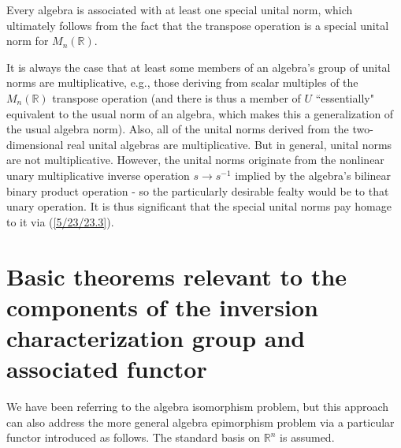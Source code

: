\documentclass{amsart}
\numberwithin{equation}{section}
\theoremstyle{definition}
\numberwithin{theorem}{section}
\begin{document}
Every algebra is associated with at least one special unital norm, which ultimately follows from the fact that the transpose operation is a special unital norm for $M_n(\mathbb{R})$.

It is always the case that at least some members of an algebra's group of unital norms are multiplicative, e.g., those deriving from scalar multiples of the $M_n(\mathbb{R})$ transpose operation (and there is thus a member of $ U$ ``essentially" equivalent to the usual norm of an algebra, which makes this a generalization of the usual algebra norm).  Also, all of the unital norms derived from the two-dimensional real unital algebras are multiplicative.   But in general, unital norms are not multiplicative.  However, the unital norms originate from the nonlinear unary multiplicative inverse operation $s\rightarrow s^{-1}$ implied by the algebra's bilinear binary product operation - so the particularly desirable fealty would be to that unary operation.  It is thus significant that the special unital norms pay homage to it via (\ref{5/23/23.3}). 


\section{Basic theorems relevant to the components of the inversion characterization group and associated functor}

We have been referring to the algebra isomorphism problem, but this approach can also address the more general algebra epimorphism problem via a particular functor introduced as follows.  The standard basis on $\mathbb{R}^n$ is assumed. 
\end{document}
